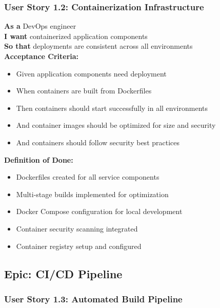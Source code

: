 \subsubsection{User Story 1.2: Containerization Infrastructure}

\begin{tcolorbox}[colback=lightgray, colframe=primaryblue, title=US-1.2: Containerization Infrastructure]
\textbf{As a} DevOps engineer \\
\textbf{I want} containerized application components \\
\textbf{So that} deployments are consistent across all environments \\

\textbf{Acceptance Criteria:}
\begin{itemize}
    \item Given application components need deployment
    \item When containers are built from Dockerfiles
    \item Then containers should start successfully in all environments
    \item And container images should be optimized for size and security
    \item And containers should follow security best practices
\end{itemize}

\textbf{Definition of Done:}
\begin{itemize}
    \item Dockerfiles created for all service components
    \item Multi-stage builds implemented for optimization
    \item Docker Compose configuration for local development
    \item Container security scanning integrated
    \item Container registry setup and configured
\end{itemize}
\end{tcolorbox}

\subsection{Epic: CI/CD Pipeline}

\subsubsection{User Story 1.3: Automated Build Pipeline}

